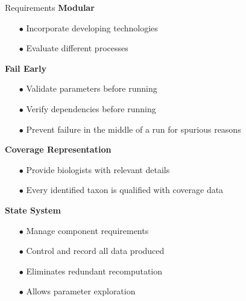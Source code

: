 \documentclass[final,t]{beamer}
\begin{document}
\begin{frame}{}
\begin{columns}[t]
\begin{column}{.3\linewidth}
        \begin{block}{Requirements}
            \textbf{Modular}
            \begin{itemize}
                \item[$\bullet$]Incorporate developing technologies
                \item[$\bullet$]Evaluate different processes
            \end{itemize}
            \vspace{1cm}
            \textbf{Fail Early}
            \begin{itemize}
                \item[$\bullet$]Validate parameters before running
                \item[$\bullet$]Verify dependencies before running
                \item[$\bullet$]Prevent failure in the middle of a run for spurious reasons
            \end{itemize}
            \vspace{1cm}
            \textbf{Coverage Representation}
            \begin{itemize}
                \item[$\bullet$]Provide biologists with relevant details
                \item[$\bullet$]Every identified taxon is qualified with coverage data
            \end{itemize}
            \vspace{1cm}
            \textbf{State System}
            \begin{itemize}
                \item[$\bullet$]Manage component requirements
                \item[$\bullet$]Control and record all data produced
                \item[$\bullet$]Eliminates redundant recomputation
                \item[$\bullet$]Allows parameter exploration
            \end{itemize}
        \end{block}






\end{column}
\end{columns}
\end{frame}
\end{document}
